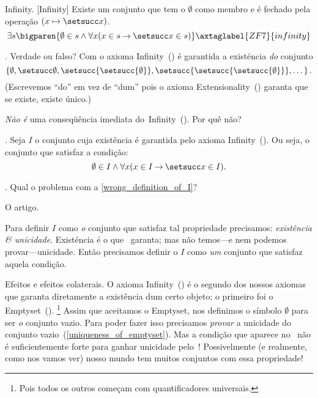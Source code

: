 \axiom Infinity.
[Infinity]%
\label{infinity}%
Existe um conjunto que tem o $\emptyset$ como membro e é fechado pela
operação $(x \mapsto \setsucc x)$.
$$
\exists s
\bigparen{
\emptyset \in s
\land
\forall x
\paren{
x \in s
\limplies
\setsucc x \in s
}
}
\axtaglabel{ZF7}{infinity}
$$

\exercise.
Verdade ou falso?
Com o axioma Infinity~() é garantida a existéncia \emph{do} conjunto
$$
\set {
\emptyset,
\setsucc\emptyset,
\setsucc{\setsucc{\emptyset}},
\setsucc{\setsucc{\setsucc{\emptyset}}},
\dotsc
}.
$$
(Escrevemos ``do'' em vez de ``dum'' pois o axioma
Extensionality~() garanta que se existe, existe único.)

\hint
\emph{Não é} uma conseqüência imediata do~Infinity~().
Por quê não?

\endexercise

.
\label{wrong_definition_of_I}%
Seja $I$ o conjunto cuja existência é garantida pelo axioma Infinity~().
Ou seja, o conjunto que satisfaz a condição:
$$
\emptyset \in I \land \forall x \paren{x \in I \limplies \setsucc x \in I}.
$$
\mistake

\exercise.
\label{def_of_I_used_definite_articile}%
Qual o problema com a \ref{wrong_definition_of_I}?

\hint
O artigo.

\solution
Para definir $I$ como \emph{o} conjunto que satisfaz tal propriedade
precisamos: \emph{existência \& unicidade}.
Existéncia é o que~ garanta;
mas não temos---e nem podemos provar---unicidade.
Então precisamos definir o $I$ como \emph{um} conjunto
que satisfaz aquela condição.

\endexercise

\note Efeitos e efeitos colaterais.
O axioma Infinity~() é o segundo dos nossos axiomas
que garanta diretamente a existência dum certo objeto;
o primeiro foi o Emptyset~().%
\footnote{Pois todos os outros começam com quantificadores universais.}
Assim que aceitamos o Emptyset, nos definimos o símbolo $\emptyset$
para ser \emph{o} conjunto vazio.
Para poder fazer isso precisamos \emph{provar} a unicidade
do conjunto vazio~(\ref{uniqueness_of_emptyset}).
Mas a condição que aparece no~ não é
suficientemente forte para ganhar unicidade pelo~!
Possivelmente (e realmente, como nos vamos ver) nosso mundo tem muitos
conjuntos com essa propriedade!

